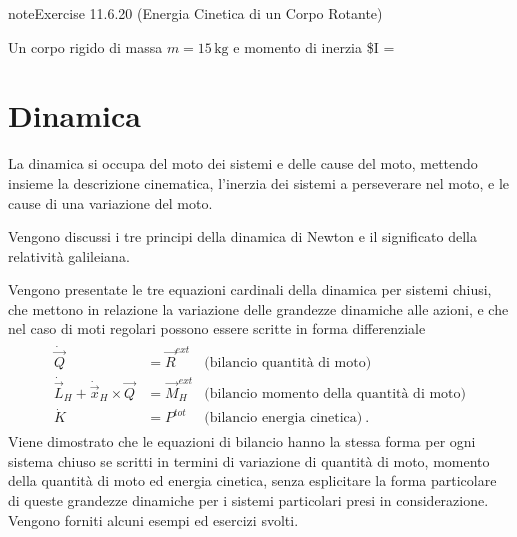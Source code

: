 \documentclass[letterpaper,10pt,italian]{jupyterBook}
\begin{document}
\begin{sphinxadmonition}{note}{Exercise 11.6.20 (Energia Cinetica di un Corpo Rotante)}



\sphinxAtStartPar
Un corpo rigido di massa \(m = 15 \, \text{kg}\) e momento di inerzia \$I =
\end{sphinxadmonition}

\sphinxstepscope




\chapter{Dinamica}
\label{\detokenize{ch/mechanics/dynamics:dinamica}}\label{\detokenize{ch/mechanics/dynamics:physics-hs-mechanics-dynamics}}\label{\detokenize{ch/mechanics/dynamics::doc}}
\sphinxAtStartPar
La dinamica si occupa del moto dei sistemi e delle cause del moto, mettendo insieme la descrizione cinematica, l’inerzia dei sistemi a perseverare nel moto, e le cause di una variazione del moto.

\sphinxAtStartPar
{} Vengono discussi i tre principi della dinamica di Newton e il significato della relatività galileiana.

\sphinxAtStartPar
{} Vengono presentate le tre equazioni cardinali della dinamica per sistemi chiusi, che mettono in relazione la variazione delle grandezze dinamiche alle azioni, e che nel caso di moti regolari possono essere scritte in forma differenziale
\begin{equation*}
\begin{split}\begin{aligned}
 \dot{\vec{Q}} & = \vec{R}^{ext} & \text{(bilancio quantità di moto)} \\
 \dot{\vec{L}}_H + \dot{\vec{x}}_H \times \vec{Q} & = \vec{M}_H^{ext} & \text{(bilancio momento della quantità di moto)} \\
 \dot{K} & = P^{tot} & \text{(bilancio energia cinetica)} \ .
\end{aligned}\end{split}
\end{equation*}
\sphinxAtStartPar
Viene dimostrato che le equazioni di bilancio hanno la stessa forma per ogni sistema chiuso se scritti in termini di variazione di quantità di moto, momento della quantità di moto ed energia cinetica, senza esplicitare la forma particolare di queste grandezze dinamiche per i sistemi particolari presi in considerazione. Vengono forniti alcuni esempi ed esercizi svolti.
\end{document}
